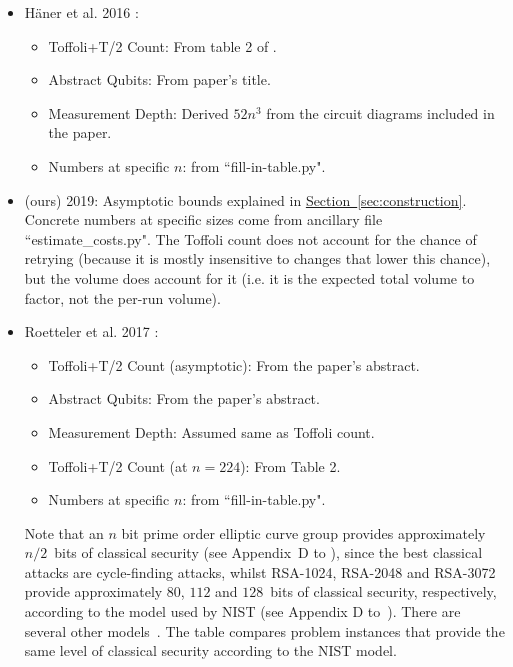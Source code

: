 \documentclass[a4paper, onecolumn, accepted=2021-03-29]{quantumarticle}
\renewcommand{\sec}[1]{\hyperref[sec:#1]{Section~\ref*{sec:#1}}}
\begin{document}
\begin{itemize}
\begin{itemize}
    \end{itemize}
    \item H\"{a}ner et al. 2016 \cite{haner2016factoring}:
    \begin{itemize}
        \item Toffoli+T/2 Count:
            From table 2 of \cite{roetteler2017quantum}.
        \item Abstract Qubits:
            From paper's title.
        \item Measurement Depth:
            Derived $52n^3$ from the circuit diagrams included in the paper.
        \item Numbers at specific $n$: from ``fill-in-table.py".
    \end{itemize}
    \item (ours) 2019:
        Asymptotic bounds explained in \sec{construction}.
        Concrete numbers at specific sizes come from ancillary file ``estimate\_costs.py".
        The Toffoli count does not account for the chance of retrying (because it is mostly insensitive to changes that lower this chance), but the volume does account for it (i.e. it is the expected total volume to factor, not the per-run volume).
    \item Roetteler et al. 2017 \cite{roetteler2017quantum}:
        \begin{itemize}
            \item Toffoli+T/2 Count (asymptotic):
                From the paper's abstract.
            \item Abstract Qubits:
                From the paper's abstract.
            \item Measurement Depth:
                Assumed same as Toffoli count.
            \item Toffoli+T/2 Count (at $n=224$):
                From Table 2.
            \item Numbers at specific $n$: from ``fill-in-table.py".
        \end{itemize}
        Note that an $n$ bit prime order elliptic curve group provides approximately $n/2$~bits of classical security (see Appendix~D to \cite{nist-sp-800-56-part1-rev3-2018}), since the best classical attacks are cycle-finding attacks,
        whilst RSA-1024, RSA-2048 and RSA-3072 provide approximately $80$, $112$ and $128$~bits of classical security, respectively, according to the model used by NIST (see Appendix D to~\cite{nist-sp-800-56-part2-rev2-2018}).
        There are several other models~\cite{keylength2019, lenstra-model-2004, lenstra-verheul-model-2001}.
        The table compares problem instances that provide the same level of classical security according to the NIST model.
\end{itemize}
\end{document}
